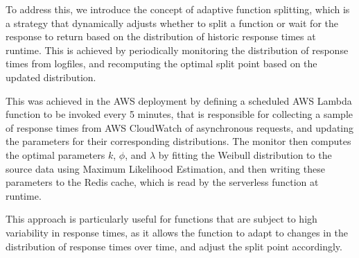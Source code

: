 To address this, we introduce the concept of adaptive function splitting, which is a strategy that dynamically adjusts whether to split a function or wait for the response to return based on the distribution of historic response times at runtime. This is achieved by periodically monitoring the distribution of response times from logfiles, and recomputing the optimal split point based on the updated distribution.

This was achieved in the AWS deployment by defining a scheduled AWS Lambda function to be invoked every 5 minutes, that is responsible for collecting a sample of response times from AWS CloudWatch of asynchronous requests, and updating the parameters for their corresponding distributions. The monitor then computes the optimal parameters $k$, $\phi$, and $\lambda$ by fitting the Weibull distribution to the source data using Maximum Likelihood Estimation, and then writing these parameters to the Redis cache, which is read by the serverless function at runtime.

This approach is particularly useful for functions that are subject to high variability in response times, as it allows the function to adapt to changes in the distribution of response times over time, and adjust the split point accordingly.

